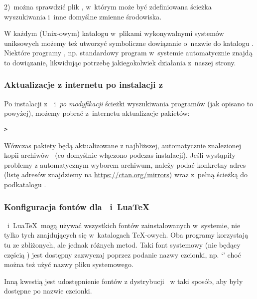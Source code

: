 \documentclass{article}
\begin{document}
 2)~można sprawdzić plik , w~którym może być
zdefiniowana ścieżka wyszukiwania i~inne domyślne zmienne środowiska.

W każdym (Unix-owym) katalogu w~plikami wykonywalnymi systemów uniksowych możemy też utworzyć
symboliczne dowiązanie o~nazwie  do katalogu
. Niektóre programy , np. standardowy
program  w~systemie \macOS  automatycznie znajdą to dowiązanie,
likwidując potrzebę jakiegokolwiek działania z~naszej strony.

\subsubsection{Aktualizacje z internetu po instalacji z \DVD}
\label{sec:dvd-install-net-updates}

Po instalacji \TL{} z~\DVD\ i~\textit{po modyfikacji} ścieżki wyszukiwania
programów (jak opisano to powyżej), możemy pobrać z~internetu aktualizacje
pakietów:

\begin{alltt}
> 
\end{alltt}

Wówczas pakiety będą aktualizowane z najbliższej, automatycznie
znalezionej kopii archiwów \CTAN\ (co domyślnie włączono podczas instalacji).
Jeśli wystąpiły problemy z automatycznym wyborem archiwum, należy podać
konkretny adres (listę adresów znajdziemy na \url{https://ctan.org/mirrors})
wraz z~pełną ścieżką do podkatalogu .

\subsubsection{Konfiguracja fontów dla \protect\XeTeX\protect\ i~Lua\protect\TeX}
\label{sec:font-conf-sys}

\XeTeX\ i~Lua\TeX\ mogą używać wszystkich fontów zainstalowanych w~systemie, nie
tylko tych znajdujących się  w~katalogach \TeX-owych. Oba programy korzystają
tu ze zbliżonych, ale jednak różnych metod.
Taki   font systemowy (nie będący częścią \TL) jest dostępny zazwyczaj poprzez podanie nazwy czcionki, np. `' choć można też użyć nazwy pliku systemowego.

Inną kwestią jest udostępnienie fontów z dystrybucji \TL\ w taki sposób, aby były dostępne po nazwie czcionki.
\end{document}
